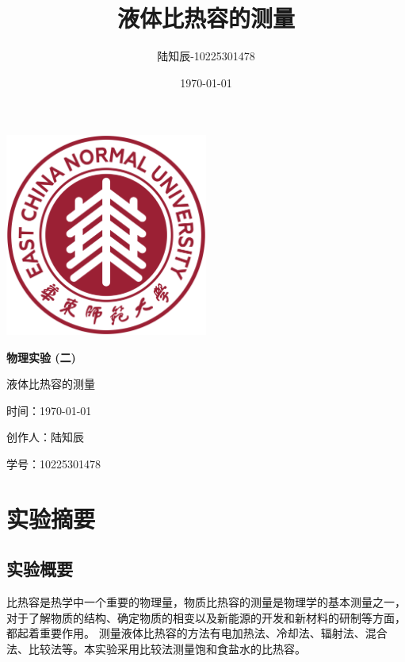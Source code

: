 \documentclass{ctexart}
\title{液体比热容的测量}
\author{陆知辰-10225301478}
\date{\today}
\begin{document}
\begin{titlepage}
  \centering
  \includegraphics[width=0.5\textwidth]{ecnu.png}
  
  \vspace*{\baselineskip}
  
  \Huge\textbf{物\quad 理\quad 实\quad 验 \quad (二)}
  \vspace*{0.3\baselineskip}
  
  \huge 液体比热容的测量
  
  \vspace*{2\baselineskip}
  
  \large 时间：\today
  
  \vspace*{\baselineskip}
  
  \large 创作人：陆知辰
  
  \vspace*{\baselineskip}
  
  \large 学号：10225301478
  
\end{titlepage}
\newpage
\tableofcontents
\newpage
\section{实验摘要}
  \subsection{实验概要}
  比热容是热学中一个重要的物理量，物质比热容的测量是物理学的基本测量之一，
  对于了解物质的结构、确定物质的相变以及新能源的开发和新材料的研制等方面，都起着重要作用。
  测量液体比热容的方法有电加热法、冷却法、辐射法、混合法、比较法等。本实验采用比较法测量饱和食盐水的比热容。
\end{document}
